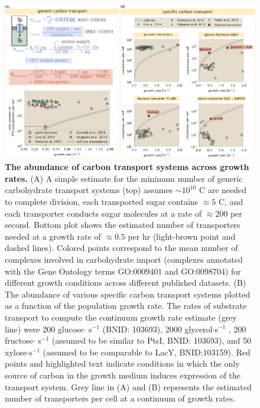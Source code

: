 \begin{figure}
    \begin{fullwidth}
    \includegraphics{main_figs/fig2_carbon_transport.pdf}
    \caption{\textbf{The abundance of carbon transport systems across growth
    rates.} (A) A simple estimate for the minimum number of generic carbohydrate
    transport systems (top) assumes $\sim 10^{10}$ C are needed to complete
    division, each transported sugar contains $\approx 5$ C, and each
    transporter conducts sugar molecules at a rate of $\approx 200$ per second.
    Bottom plot shows the estimated number of transporters needed at a growth
    rate of $\approx 0.5 $ per hr (light-brown point and dashed lines).  Colored
    points correspond to the mean number of complexes involved in carbohydrate import
    (complexes annotated with the Gene Ontology terms GO:0009401 and GO:0098704) for
    different growth conditions across different published datasets. (B) The
    abundance of various specific carbon transport systems plotted as a function
    of the population growth rate. The rates of substrate transport to compute
    the continuum growth rate estimate (grey line) were 200 glucose$\cdot$
    s$^{-1}$ (BNID: 103693),  2000 glycerol$\cdot$s$^{-1}$
    \citep{lu2003}, 200 fructose$\cdot$
    s$^{-1}$ (assumed to be similar to PtsI, BNID: 103693), and 50 xylose$\cdot$s$^{-1}$
    (assumed to be comparable to LacY, BNID:103159).
    Red points and highlighted text indicate conditions in
    which the
    only source of carbon in the growth medium induces expression of the
    transport system. Grey line in (A) and (B) represents the estimated number of transporters per cell at a continuum
    of growth rates.}\label{fig:carbon_tport}
\end{fullwidth}
\end{figure}
